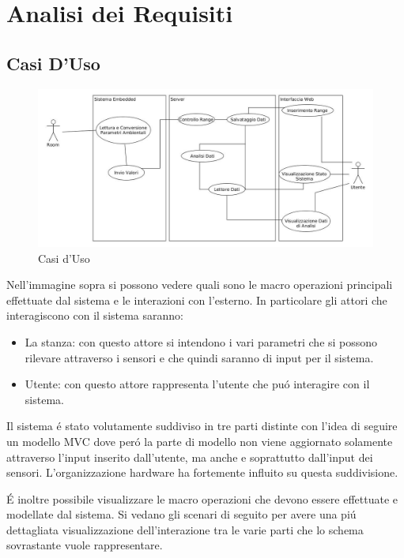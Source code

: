 \section{Analisi dei Requisiti}
\subsection{Casi D'Uso}

\begin{figure}[ht]
\centering
\includegraphics[width=\textwidth]{Figures/UseCases}
\caption{Casi d'Uso}
\end{figure}

Nell'immagine sopra si possono vedere quali sono le macro operazioni principali effettuate dal sistema e le interazioni con l'esterno. In particolare gli attori che interagiscono con il sistema saranno:

\begin{itemize}
  \item La stanza: con questo attore si intendono i vari parametri che si possono rilevare attraverso i sensori e che quindi saranno di input per il sistema.
  \item Utente: con questo attore rappresenta l'utente che pu\'o interagire con il sistema.
\end{itemize}

Il sistema \'e stato volutamente suddiviso in tre parti distinte con l'idea di seguire un modello MVC dove per\'o la parte di modello non viene aggiornato solamente attraverso l'input inserito dall'utente, ma anche e soprattutto dall'input dei sensori. L'organizzazione hardware ha fortemente influito su questa suddivisione.

\'E inoltre possibile visualizzare le macro operazioni che devono essere effettuate e modellate dal sistema. Si vedano gli scenari di seguito per avere una pi\'u dettagliata visualizzazione dell'interazione tra le varie parti che lo schema sovrastante vuole rappresentare.


